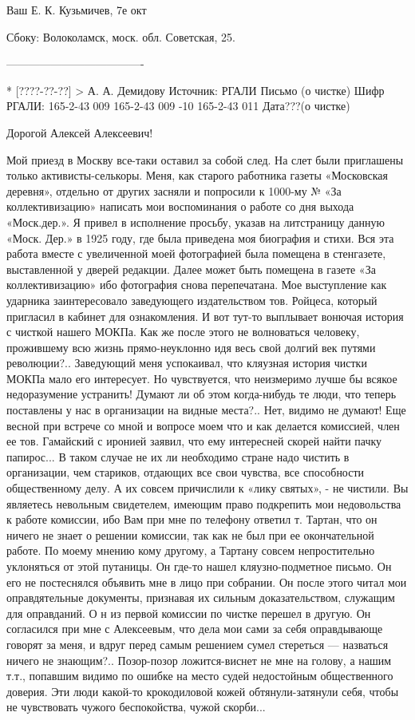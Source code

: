 Ваш Е. К. Кузьмичев, 7е окт

Сбоку: Волоколамск, моск. обл. Советская, 25.

-------------------------------------

* [????-??-??] > А. А. Демидову 
Источник: РГАЛИ
Письмо (о чистке)
Шифр РГАЛИ:     165-2-43 009
                165-2-43 009 -10
                165-2-43 011
                                                                                                                Дата???(о чистке)

                                                              Дорогой
                                            Алексей Алексеевич!

Мой приезд в Москву все-таки оставил за собой след. На слет были приглашены только активисты-селькоры. Меня, как старого работника газеты «Московская деревня», отдельно от других засняли и попросили к 1000-му № «За коллективизацию» написать мои воспоминания о работе со дня выхода «Моск.дер.». Я привел в исполнение просьбу, указав на 
литстраницу данную «Моск. Дер.» в 1925 году, где была приведена моя биография и стихи. Вся эта работа вместе с увеличенной моей фотографией была помещена в стенгазете, выставленной у дверей редакции. Далее может быть помещена в газете «За коллективизацию» ибо фотография снова перепечатана.
Мое выступление как ударника заинтересовало заведующего издательством тов. Ройцеса, который пригласил в кабинет для ознакомления. И вот тут-то выплывает вонючая история с чисткой нашего МОКПа. Как же после этого не волноваться человеку, прожившему всю жизнь прямо-неуклонно идя весь свой долгий век путями революции?.. Заведующий меня успокаивал, что кляузная история чистки МОКПа мало его интересует. Но чувствуется, что неизмеримо лучше бы всякое недоразумение устранить!
Думают ли об этом когда-нибудь те люди, что теперь поставлены у нас в организации на видные места?.. Нет, видимо не думают! Еще весной при встрече со мной и вопросе моем что и как делается комиссией, член ее тов. Гамайский с иронией заявил, что ему интересней скорей найти пачку папирос... В таком случае не их ли необходимо стране надо чистить в организации, чем стариков, отдающих все свои чувства, все способности общественному делу. А их совсем причислили к «лику святых», - не чистили. Вы являетесь невольным свидетелем, имеющим право подкрепить мои недовольства к работе комиссии, ибо Вам при мне по телефону ответил т. Тартан, что он ничего не знает о решении комиссии, так как не был при ее окончательной работе. По моему мнению кому другому, а Тартану совсем непростительно уклоняться от этой путаницы. Он где-то нашел кляузно-подметное письмо. Он его не постеснялся объявить мне в лицо при собрании. Он после этого читал мои оправдятельные документы, признавая их сильным доказательством, служащим для оправданий. О н из первой комиссии по чистке перешел в другую. Он согласился при мне с Алексеевым, что дела мои сами за себя оправдывающе говорят за меня, и вдруг перед самым решением сумел стереться — назваться ничего не знающим?.. Позор-позор ложится-виснет не мне на голову, а нашим т.т., попавшим видимо по ошибке на место судей недостойным общественного доверия. Эти люди какой-то крокодиловой кожей обтянули-затянули себя, чтобы не чувствовать чужого беспокойства, чужой скорби...
